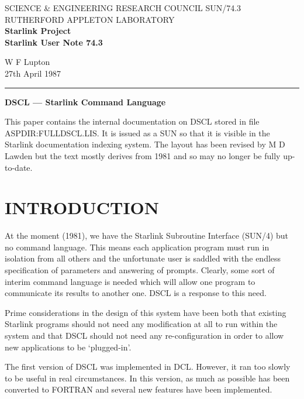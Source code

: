 \setlength{\textwidth}{153mm}
\setlength{\textheight}{220mm}
\setlength{\oddsidemargin}{3mm}
\setlength{\evensidemargin}{3mm}
\pagestyle{myheadings}


\thispagestyle{plain}
\noindent
SCIENCE \& ENGINEERING RESEARCH COUNCIL \hfill SUN/74.3\\
RUTHERFORD APPLETON LABORATORY\\
{\large\bf Starlink Project\\}
{\large\bf Starlink User Note 74.3}
\begin{flushright}
W F Lupton\\
27th April 1987
\end{flushright}
\vspace{-4mm}
\rule{\textwidth}{0.5mm}
\vspace{9mm}
\begin{center}
{\Large\bf DSCL --- Starlink Command Language}
\end{center}
\vspace{9mm}
\tableofcontents
{}
\newpage
This paper contains the internal documentation on DSCL stored in file
ASPDIR:FULLDSCL.LIS.
It is issued as a SUN so that it is visible in the Starlink documentation
indexing system.
The layout has been revised by M D Lawden but the text mostly derives from 1981
and so may no longer be fully up-to-date.
\section {INTRODUCTION}
At the moment (1981), we have the Starlink Subroutine  Interface  (SUN/4) but no
command language.
This means each application program must run in isolation from all others and
the unfortunate user is saddled with the endless specification of parameters and
answering of prompts.
Clearly, some sort of interim command language is needed which will allow one
program to communicate its results to another one.
DSCL is a response to this need.

Prime considerations in the design of this system have been both that existing
Starlink programs should not need any modification at all to run within the
system and that DSCL should not need any re-configuration in order to allow new
applications to be `plugged-in'.

The first version of DSCL was implemented in DCL.
However, it ran too slowly to be useful in real circumstances.
In this version, as much as possible has been converted to FORTRAN and several
new features have been implemented.


